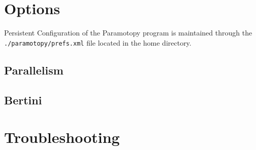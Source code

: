 \documentclass[10pt]{article}
\newcommand{\singlespace}[1]{{\setlength{\baselineskip}{0.6\baselineskip} {#1} \par}}
\begin{document}
\section{Options}

Persistent Configuration of the Paramotopy program is maintained through the \texttt{./paramotopy/prefs.xml} file located in the home directory.

\subsection{Parallelism}

\subsection{Bertini}

\section{Troubleshooting}


\singlespace{


}

\singlespace{\printindex}
\end{document}
